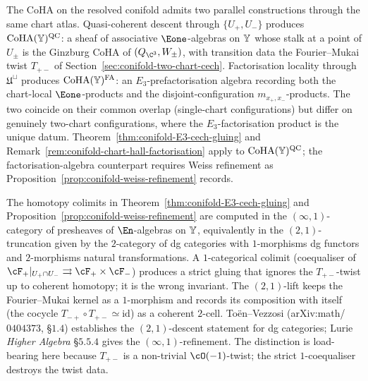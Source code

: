 \begin{remark}
\label{rem:conifold-qc-fa-distinction}
The CoHA on the resolved conifold admits two parallel constructions through the same chart atlas. Quasi-coherent descent through $\{U_+, U_-\}$ produces $\mathrm{CoHA}(\mathbb{Y})^{\mathrm{QC}}$: a sheaf of associative $\Eone$-algebras on $\mathbb{Y}$ whose stalk at a point of $U_\pm$ is the Ginzburg CoHA of $(Q_{\C^3}, W_\pm)$, with transition data the Fourier--Mukai twist $T_{+-}$ of Section~\ref{sec:conifold-two-chart-cech}. Factorisation locality through $\mathfrak U^\sqcup$ produces $\mathrm{CoHA}(\mathbb{Y})^{\mathrm{FA}}$: an $E_3$-prefactorisation algebra recording both the chart-local $\Eone$-products and the disjoint-configuration $m_{x_+, x_-}$-products. The two coincide on their common overlap (single-chart configurations) but differ on genuinely two-chart configurations, where the $E_3$-factorisation product is the unique datum. Theorem~\ref{thm:conifold-E3-cech-gluing} and Remark~\ref{rem:conifold-chart-hall-factorisation} apply to $\mathrm{CoHA}(\mathbb{Y})^{\mathrm{QC}}$; the factorisation-algebra counterpart requires Weiss refinement as Proposition~\ref{prop:conifold-weiss-refinement} records.
\end{remark}

\begin{remark}
\label{rem:conifold-hocolim-2cat}
The homotopy colimits in Theorem~\ref{thm:conifold-E3-cech-gluing} and Proposition~\ref{prop:conifold-weiss-refinement} are computed in the $(\infty, 1)$-category of presheaves of $\En$-algebras on $\mathbb{Y}$, equivalently in the $(2, 1)$-truncation given by the $2$-category of dg categories with $1$-morphisms dg functors and $2$-morphisms natural transformations. A $1$-categorical colimit (coequaliser of $\cF_+|_{U_+ \cap U_-} \rightrightarrows \cF_+ \times \cF_-$) produces a strict gluing that ignores the $T_{+-}$-twist up to coherent homotopy; it is the wrong invariant. The $(2,1)$-lift keeps the Fourier--Mukai kernel as a $1$-morphism and records its composition with itself (the cocycle $T_{-+} \circ T_{+-} \simeq \mathrm{id}$) as a coherent $2$-cell. Toën--Vezzosi (arXiv:math/$0404373$, §$1.4$) establishes the $(2,1)$-descent statement for dg categories; Lurie \emph{Higher Algebra} §$5.5.4$ gives the $(\infty,1)$-refinement. The distinction is load-bearing here because $T_{+-}$ is a non-trivial $\cO(-1)$-twist; the strict $1$-coequaliser destroys the twist data.
\end{remark}

